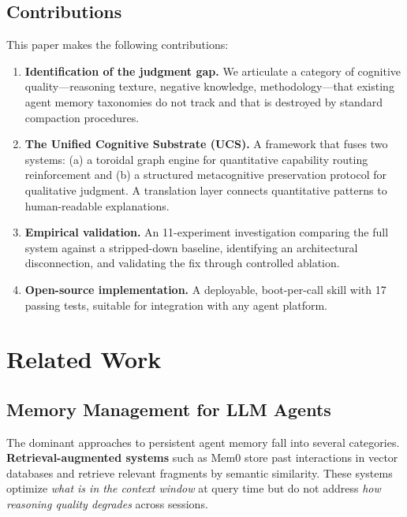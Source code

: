 \documentclass[11pt,a4paper]{article}
\begin{document}
\subsection{Contributions}

This paper makes the following contributions:

\begin{enumerate}[leftmargin=*]
\item \textbf{Identification of the judgment gap.} We articulate a
  category of cognitive quality---reasoning texture, negative knowledge,
  methodology---that existing agent memory taxonomies do not track and
  that is destroyed by standard compaction procedures.

\item \textbf{The Unified Cognitive Substrate (UCS).} A framework that
  fuses two systems: (a) a toroidal graph engine for quantitative
  capability routing reinforcement and (b) a structured metacognitive
  preservation protocol for qualitative judgment. A translation layer
  connects quantitative patterns to human-readable explanations.

\item \textbf{Empirical validation.} An 11-experiment investigation
  comparing the full system against a stripped-down baseline,
  identifying an architectural disconnection, and validating the fix
  through controlled ablation.

\item \textbf{Open-source implementation.} A deployable, boot-per-call
  skill with 17 passing tests, suitable for integration with any
  agent platform.
\end{enumerate}


\section{Related Work}
\label{sec:related}

\subsection{Memory Management for LLM Agents}

The dominant approaches to persistent agent memory fall into several
categories. \textbf{Retrieval-augmented systems} such as Mem0
\citep{mem0_2025} store past interactions in vector databases and
retrieve relevant fragments by semantic similarity. These systems
optimize \emph{what is in the context window} at query time but do
not address \emph{how reasoning quality degrades} across sessions.
\end{document}
